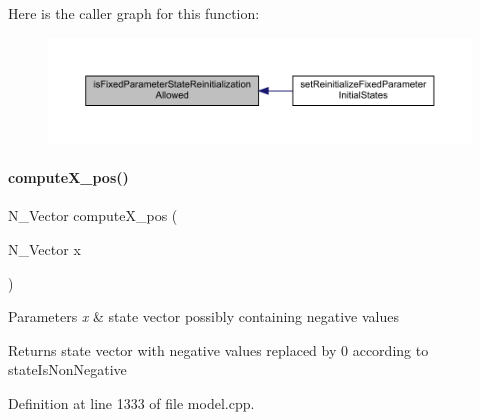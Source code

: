 Here is the caller graph for this function\+:
\nopagebreak
\begin{figure}[H]
\begin{center}
\leavevmode
\includegraphics[width=350pt]{classamici_1_1_model_aee70a0075a3b36896dee7ba80415df3c_icgraph}
\end{center}
\end{figure}
\mbox{\label{classamici_1_1_model_a0c06c5326bb82ceedba30171c122cb8a}} 
\paragraph{\texorpdfstring{compute\+X\+\_\+pos()}{computeX\_pos()}}
{\footnotesize\ttfamily N\+\_\+\+Vector compute\+X\+\_\+pos (\begin{DoxyParamCaption}\item[{N\+\_\+\+Vector}]{x }\end{DoxyParamCaption})\hspace{0.3cm}{\ttfamily [protected]}}


\begin{DoxyParams}{Parameters}
{\em x} & state vector possibly containing negative values \\
\hline
\end{DoxyParams}
\begin{DoxyReturn}{Returns}
state vector with negative values replaced by 0 according to state\+Is\+Non\+Negative 
\end{DoxyReturn}


Definition at line 1333 of file model.\+cpp.

